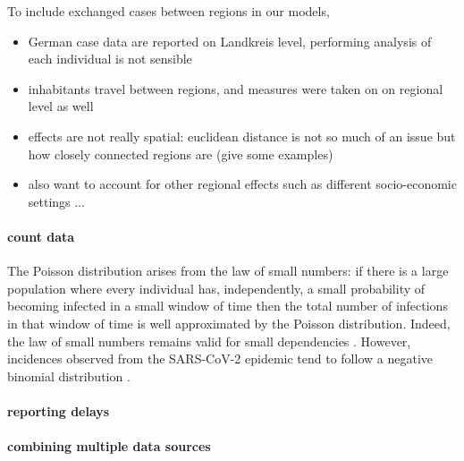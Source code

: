 To include exchanged cases between regions in our models, 


\begin{itemize}
    \item German case data are reported on Landkreis level, performing analysis of each individual is not sensible 
    \item inhabitants travel between regions, and measures were taken on on regional level as well
    \item effects are not really spatial: euclidean distance is not so much of an issue but how closely connected regions are (give some examples)
    \item also want to account for other regional effects such as different socio-economic settings ... 
\end{itemize}

\paragraph{count data}

The Poisson distribution arises from the law of small numbers: if there is a large population where every individual has, independently, a small probability of becoming infected in a small window of time then the total number of infections in that window of time is well approximated by the Poisson distribution.
Indeed, the law of small numbers remains valid for small dependencies \citep{Ross2011Fundamentalsa,Arratia1990Poisson}.
However, incidences observed from the SARS-CoV-2 epidemic tend to follow a negative binomial distribution \citep{Chan2021Count}. 

\paragraph{reporting delays}

\paragraph{combining multiple data sources}



